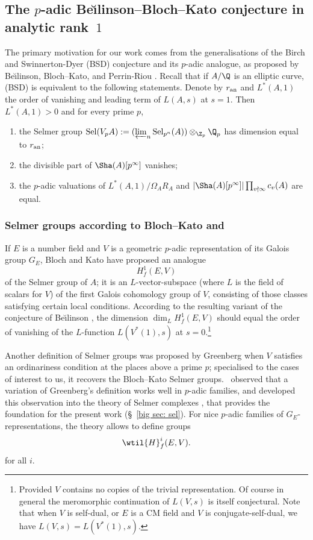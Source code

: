 \subsection{The $p$-adic {Be\u\i linson}--Bloch--Kato conjecture in analytic rank~$1$} \label{sec: BK}
 The primary  motivation for our work comes from  the generalisations of  the Birch and Swinnerton-Dyer (BSD) conjecture and its $p$-adic analogue, as proposed by {Be\u\i linson}, Bloch--Kato, and Perrin-Riou \cite{bei,bk,PRbook}. Recall that if $A/\Q$ is an elliptic curve, (BSD) is equivalent to the following statements. Denote by   $r_{\rm an}$ and $L^{*}(A, 1)$ the order of vanishing and leading term  of $L(A, s)$ at $s=1$. Then
  $L^{*}(A,1) >0$ and for every prime  $p$,
  \begin{enumerate}[label=(\alph*)]
  \item
 the Selmer group ${\rm Sel}(V_{p}A):=(\varprojlim_{n} {\rm Sel}_{p^{n}}(A)) \otimes_{\Z_{p}} \Q_{p}$ has dimension equal to $r_{\rm an}$;
\item  the divisible part  of $\Sha(A)[p^{\infty}]$ vanishes;
\item the $p$-adic valuations of $L^{*}(A, 1)/\Omega_{A} R_{A}$ and $|\Sha(A)[p^{\infty}]|\prod_{v\nmid \infty}c_{v}(A)$ are equal.
  \end{enumerate}


\subsubsection{Selmer groups according to Bloch--Kato and \nek} If $E$ is a number field and $V$ is a geometric $p$-adic  representation of its Galois group $G_{E}$, Bloch  and Kato \cite{bk} have proposed an analogue
$$H^{1}_{f}(E,V)$$ of the Selmer group of $A$; it is an $L$-vector-subspace (where $L$ is the field of scalars for $V$) of the first Galois cohomology group of $V$, consisting of those classes satisfying certain local conditions. According to the resulting variant of the  conjecture of  {Be\u\i linson} \cite{bei}, the dimension
$\dim_{L} H^{1}_{f}(E, V)$ should equal   the    order of vanishing of the $L$-function $L(V^{*}(1), s)$ at $s=0$.\footnote{Provided $V$ contains no copies of the trivial representation. Of course in general the   meromorphic continuation of $L(V,s)$ is itself conjectural. Note that when $V$ is self-dual, or $E$ is a CM field and $V$ is   conjugate-self-dual, we have $L(V,s)=L(V^{*}(1), s)$.}

Another definition of Selmer groups   was proposed by Greenberg when $V$ satisfies an ordinariness condition at the places above  a prime $p$; specialised to the cases of interest to us,  it recovers the Bloch--Kato Selmer groups. \nek\ observed that a variation of Greenberg's definition works well in $p$-adic families, and developed this observation into the theory of Selmer complexes \cite{nek-selmer},  that provides the foundation for the  present work (\S~\ref{big sec: sel}). For nice $p$-adic families of $G_{E}$-representations, the theory allows to define groups
$$\wtil{H}^{i}_{f}(E, V).$$
 for all $i$.





